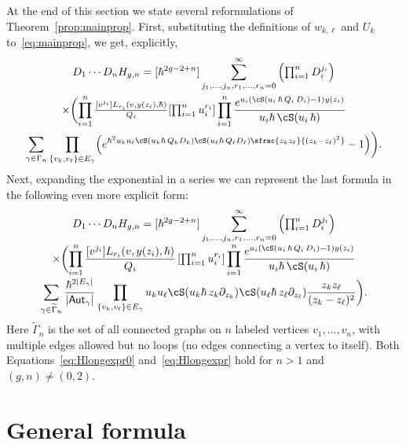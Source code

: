 At the end of this section we state several reformulations of Theorem~\ref{prop:mainprop}. First, substituting the definitions of $w_{k,\ell}$ and $U_k$ to~\eqref{eq:mainprop}, we get, explicitly,
\begin{multline}\label{eq:Hlongexpr0}
D_1\cdots D_nH_{g,n}=[\hbar^{2g-2+n}]
\sum_{j_1,\dots,j_n,r_1,\dots,r_n=0}^\infty \left(\textstyle\prod_{i=1}^nD_i^{j_i}\right)\\
\times\biggl(
\prod_{i=1}^n
\tfrac{[v^{j_i}]L_{r_i}(v,y(z_i),\hbar)}{Q_i}[{\textstyle\prod_{i=1}^n u_i^{r_i}}]
\prod_{i=1}^n
\frac{e^{u_i(\cS(u_i\,\hbar\,Q_i\,D_i)-1)y(z_i)}}{u_i\hbar\,\cS(u_i\,\hbar)}\\
\sum_{\gamma \in \Gamma_n}\prod_{\{v_k,v_\ell\}\in E_\gamma}
\Bigl(e^{\hbar^2u_ku_\ell\cS(u_k\hbar\,Q_k D_k)\cS(u_\ell\hbar\,Q_\ell D_\ell)
\sfrac{z_k z_\ell}{(z_k-z_\ell)^2}}-1\Bigr)\biggr).
\end{multline}
Next, expanding the exponential in a series we can represent the last formula in the following even more explicit form:\vspace*{-5pt}\enlargethispage{.5\baselineskip}%
\begin{multline}\label{eq:Hlongexpr}
D_1\cdots D_nH_{g,n}=[\hbar^{2g-2+n}]
\sum_{j_1,\dots,j_n,r_1,\dots,r_n=0}^\infty \left(\textstyle\prod_{i=1}^nD_i^{j_i}\right)\\[-3pt]
\times\biggl(
\prod_{i=1}^n
\frac{[v^{j_i}]L_{r_i}(v,y(z_i),\hbar)}{Q_i}\, [{\textstyle\prod_{i=1}^n u_i^{r_i}}]
\prod_{i=1}^n
\frac{e^{u_i(\cS(u_i\,\hbar\,Q_i\,D_i)-1)y(z_i)}}{u_i\hbar\,\cS(u_i\,\hbar)}\\[-2pt]
\sum_{\gamma\in\widetilde{\Gamma}_n} \frac{\hbar^{2|E_\gamma|}}{|\mathsf{Aut}_\gamma|} \prod_{\{v_k,v_\ell\}\in E_\gamma} u_ku_\ell \cS(u_k\hbar\,z_k\partial_{z_k})\cS(u_\ell\hbar\,z_\ell\partial_{z_\ell})\frac{ z_kz_\ell}{(z_k-z_\ell)^2}\biggr).
\end{multline}
Here $\widetilde{\Gamma}_n$
is the set of all connected graphs
on $n$ labeled vertices $v_1,\ldots,v_n$, with multiple edges allowed but no loops
(\ie no edges connecting a vertex to itself). Both Equations~\eqref{eq:Hlongexpr0} and~\eqref{eq:Hlongexpr} hold for $n>1$ and $(g,n)\ne(0,2)$.

\section{General formula} \label{sec:MainTh}

